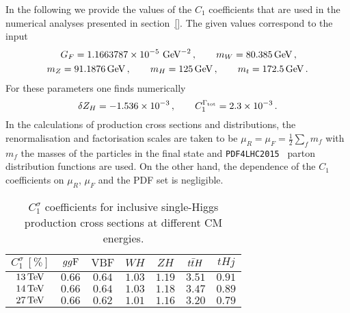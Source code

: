 In the following we provide the values of the $C_1$ coefficients that are used in the numerical analyses presented in section~\ref{}. The given values correspond to the input 
\begin{equation}
\begin{split}
& \hspace{0.5cm}  G_F = 1.1663787\times  10^{-5}~{\rm GeV}^{-2} \,, \qquad  m_W = 80.385 \, {\rm GeV} \, , \\ 
& m_Z = 91.1876 \, {\rm GeV}\,, \qquad m_H = 125 \, {\rm GeV}\, , \qquad m_t = 172.5 \, {\rm GeV} \,.
\end{split}
\end{equation}
For these parameters one finds numerically~\cite{Degrassi:2016wml} 
\begin{equation}
\delta Z_H = -1.536\times 10^{-3} \,, \qquad C_1^{\Gamma_{\rm tot}} = 2.3 \times 10^{-3} \,.
\end{equation}
In the calculations of production cross sections and distributions, the renormalisation and factorisation scales are taken to be $ \mu_R = \mu_F = \frac{1}{2} \sum_f m_f$ with $m_f$ the masses of the particles in the final state and   {\tt PDF4LHC2015}~\cite{Butterworth:2015oua}  parton distribution functions are used. On the other hand, the dependence of the $C_1$ coefficients on $ \mu_R$,  $\mu_F$ and the PDF set is negligible.

\begin{table}[t!]
\begin{center}
\begin{tabular}{|c |c| c| c| c| c| c|}
\hline
$C_1^{\sigma}~[\%]$	& ${gg{\rm F}}$ &
${\text{VBF}} $ &  ${WH}$ & ${ZH}$ &
${t\bar{t}H}$ &  ${tHj}$ \\ 
\hline \hline
$13 \, {\rm TeV}$ & $0.66$ & $0.64$  & $1.03$ & $1.19$ & $3.51$ & $0.91$ \\ \hline
$14 \, {\rm TeV}$ & $0.66$ & $0.64$  & $1.03$ & $1.18$ & $3.47$ & $0.89$ \\ \hline
$27 \, {\rm TeV}$ & $0.66$ & $0.62$  & $1.01$ & $1.16$ & $3.20$ & $0.79$ \\
 \hline
\end{tabular}
\end{center}
\caption{$C_1^{\sigma}$ coefficients for inclusive single-Higgs production cross sections at different CM energies.}
\label{c1s}
\end{table}
 
